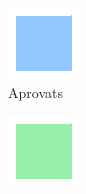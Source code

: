 \documentclass[12pt,a4paper,catalan]{article}
\begin{document}
\begin{figure}[h]
\centering
\begin{subfigure}{.2\textwidth}
  \centering
  \includegraphics[width=\linewidth]{img/aprovats.png}
  \caption{Aprovats}
\end{subfigure}
\begin{subfigure}{.2\textwidth}
  \centering
  \includegraphics[width=\linewidth]{img/bonesnotes.png}

\end{subfigure}
\end{figure}
\end{document}

